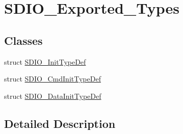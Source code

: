 \hypertarget{group___s_d_i_o___exported___types}{}\section{S\+D\+I\+O\+\_\+\+Exported\+\_\+\+Types}
\label{group___s_d_i_o___exported___types}
\subsection*{Classes}
\begin{DoxyCompactItemize}
\item 
struct \hyperlink{struct_s_d_i_o___init_type_def}{S\+D\+I\+O\+\_\+\+Init\+Type\+Def}
\item 
struct \hyperlink{struct_s_d_i_o___cmd_init_type_def}{S\+D\+I\+O\+\_\+\+Cmd\+Init\+Type\+Def}
\item 
struct \hyperlink{struct_s_d_i_o___data_init_type_def}{S\+D\+I\+O\+\_\+\+Data\+Init\+Type\+Def}
\end{DoxyCompactItemize}


\subsection{Detailed Description}

